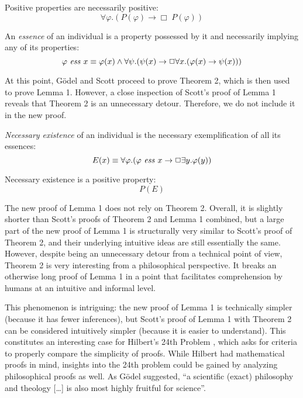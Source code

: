 \documentclass[smallextended]{svjour3}
\newcommand{\imp}{\rightarrow}
\newcommand{\all}{\forall}
\newcommand{\ex}{\exists}
\newcommand{\nec}{\Box} %
\begin{document}
\begin{axiom}
\label{N:A4}
Positive properties are necessarily positive:
$$
\all \varphi.(P(\varphi) \to \Box \; P(\varphi))
$$
\end{axiom}

\begin{definition}
\label{N:D2}
An \emph{essence} of an individual is a property possessed by it and necessarily implying any of its properties:
$$
\ess{\varphi}{x} \equiv \varphi(x) \wedge \all \psi. (\psi(x) \imp \nec \all x. (\varphi(x) \imp \psi(x)))
$$
\end{definition}


At this point, G\"odel and Scott proceed to prove Theorem 2, which is then used to prove Lemma 1. However, a close inspection of Scott's proof of Lemma 1 reveals that Theorem 2 is an unnecessary detour. Therefore, we do not include it in the new proof.


\begin{definition}
\label{N:D3}
\emph{Necessary existence} of an individual is the necessary exemplification of all its essences:
$$
E(x) \equiv \all \varphi.(\ess{\varphi}{x} \imp \nec \ex y.\varphi(y))
$$
\end{definition}


\begin{axiom}
\label{N:A5}
Necessary existence is a positive property:
$$
P(E)
$$
\end{axiom}


The new proof of Lemma 1 does not rely on Theorem 2. Overall, it is slightly shorter than Scott's proofs of Theorem 2 and Lemma 1 combined, but a large part of the new proof of Lemma 1 is structurally very similar to Scott's proof of Theorem 2, and their underlying intuitive ideas are still essentially the same. However, despite being an unnecessary detour from a technical point of view, Theorem 2 is very interesting from a philosophical perspective. It breaks an otherwise long proof of Lemma 1 in a point that facilitates comprehension by humans at an intuitive and informal level.

This phenomenon is intriguing: the new proof of Lemma 1 is technically simpler (because it has fewer inferences), but Scott's proof of Lemma 1 with Theorem 2 can be considered intuitively simpler (because it is easier to understand). This constitutes an interesting case for Hilbert's 24th Problem \citep{hilbert}, which asks for criteria to properly compare the simplicity of proofs. While Hilbert had mathematical proofs in mind, insights into the 24th problem could be gained by analyzing philosophical proofs as well. As G\"odel suggested, ``a scientific (exact) philosophy and theology [\ldots] is also most highly fruitful for science''.
\end{document}
